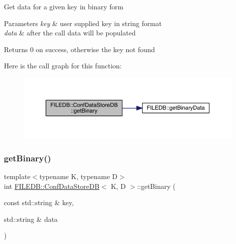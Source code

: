 Get data for a given key in binary form


\begin{DoxyParams}{Parameters}
{\em key} & user supplied key in string format \\
\hline
{\em data} & after the call data will be populated \\
\hline
\end{DoxyParams}
\begin{DoxyReturn}{Returns}
0 on success, otherwise the key not found 
\end{DoxyReturn}
Here is the call graph for this function\+:
\nopagebreak
\begin{figure}[H]
\begin{center}
\leavevmode
\includegraphics[width=350pt]{d8/d19/classFILEDB_1_1ConfDataStoreDB_a971e372585c497dad3b1bc589bc4dd15_cgraph}
\end{center}
\end{figure}
\mbox{\label{classFILEDB_1_1ConfDataStoreDB_a971e372585c497dad3b1bc589bc4dd15}} 
\subsubsection{\texorpdfstring{getBinary()}{getBinary()}\hspace{0.1cm}{\footnotesize\ttfamily [3/3]}}
{\footnotesize\ttfamily template$<$typename K, typename D$>$ \\
int \mbox{\hyperlink{classFILEDB_1_1ConfDataStoreDB}{F\+I\+L\+E\+D\+B\+::\+Conf\+Data\+Store\+DB}}$<$ K, D $>$\+::get\+Binary (\begin{DoxyParamCaption}\item[{const std\+::string \&}]{key,  }\item[{std\+::string \&}]{data }\end{DoxyParamCaption})\hspace{0.3cm}{\ttfamily [inline]}}

